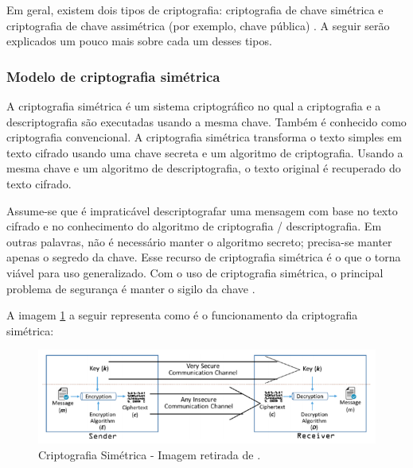     Em geral, existem dois tipos de criptografia: criptografia de chave simétrica e criptografia de chave assimétrica (por exemplo, chave pública) . A seguir serão explicados um pouco mais sobre cada um desses tipos.

        \subsubsection{Modelo de criptografia simétrica}
        
            A criptografia simétrica é um sistema criptográfico no qual a criptografia e a descriptografia são executadas usando a mesma chave. Também é conhecido como criptografia convencional. A criptografia simétrica transforma o texto simples em texto cifrado usando uma chave secreta e um algoritmo de criptografia. Usando a mesma chave e um algoritmo de descriptografia, o texto original é recuperado do texto cifrado.\cite{cryptograpy_and_network_stallings}
            
            Assume-se que é impraticável descriptografar uma mensagem com base no texto cifrado e no conhecimento do algoritmo de criptografia / descriptografia. Em outras palavras, não é necessário manter o algoritmo secreto; precisa-se manter apenas o segredo da chave. Esse recurso de criptografia simétrica é o que o torna viável para uso generalizado. Com o uso de criptografia simétrica, o principal problema de segurança é manter o sigilo da chave \cite{cryptograpy_and_network_stallings}.
            
            A imagem \ref{fig:imagem_criptografia_simetrica} a seguir representa como é o funcionamento da criptografia simétrica:
            
            \begin{figure}[H]
                 \centering
                 \includegraphics[scale=0.6]{figuras/capitulo_2/criptografia_simetrica.png}
                 \caption{Criptografia Simétrica - Imagem retirada de \cite{beginnig_blockchain_bikramaditya}.}
                 \label{fig:imagem_criptografia_simetrica}
            \end{figure}
            

